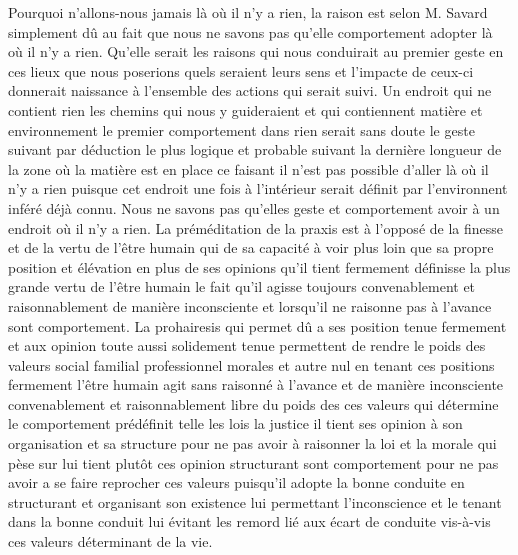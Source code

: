 \documentclass[12pt,a4paper]{article}
\begin{document}
Pourquoi n’allons-nous jamais là où il n’y a rien, la raison est selon M. Savard simplement dû au fait que nous ne savons pas qu’elle comportement adopter là où il n’y a rien. Qu’elle serait les raisons qui nous conduirait au premier geste en ces lieux que nous poserions quels seraient leurs sens et l’impacte de ceux-ci donnerait naissance à l’ensemble des actions qui serait suivi. Un endroit qui ne contient rien les chemins qui nous y guideraient et qui contiennent matière et environnement le premier comportement dans rien serait sans doute le geste suivant par déduction le plus logique et probable suivant la dernière longueur de la zone où la matière est en place ce faisant il n’est pas possible d’aller là où il n’y a rien puisque cet endroit une fois à l’intérieur serait définit par l’environnent inféré déjà connu. Nous ne savons pas qu’elles geste et comportement avoir à un endroit où il n’y a rien. La préméditation de la praxis est à l’opposé de la finesse et de la vertu de l’être humain qui de sa capacité à voir plus loin que sa propre position et élévation en plus de ses opinions qu’il tient fermement définisse la plus grande vertu de l’être humain le fait qu’il agisse toujours convenablement et raisonnablement de manière inconsciente et lorsqu’il ne raisonne pas à l’avance sont comportement. La prohairesis qui permet dû a ses position tenue fermement et aux opinion toute aussi solidement tenue permettent de rendre le poids des valeurs social familial professionnel morales et autre nul en tenant ces positions fermement l’être humain agit sans raisonné à l’avance et de manière inconsciente convenablement et raisonnablement libre du poids des ces valeurs qui détermine le comportement prédéfinit telle les lois la justice il tient ses opinion à son organisation et sa structure pour ne pas avoir à raisonner la loi et la morale qui pèse sur lui tient plutôt ces opinion structurant sont comportement pour ne pas avoir a se faire reprocher ces valeurs puisqu’il adopte la bonne conduite en structurant et organisant son existence lui permettant l’inconscience et le tenant dans la bonne conduit lui évitant les remord lié aux écart de conduite vis-à-vis ces valeurs déterminant de la vie.
\end{document}

